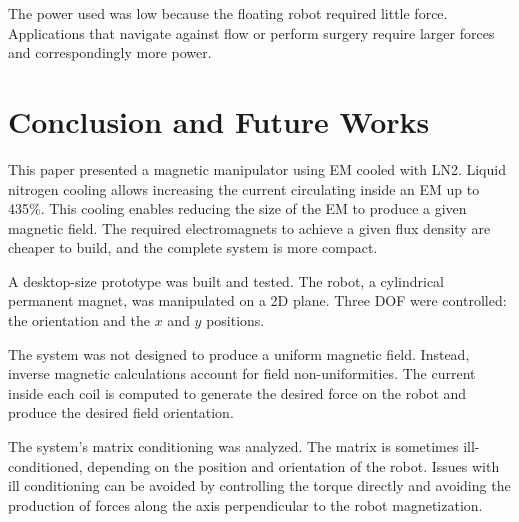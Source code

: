 The power used was low because the floating robot required little force.
Applications that navigate against flow or perform surgery require larger forces and correspondingly more power.


 
% 
\section{Conclusion and Future Works}
This paper presented a magnetic manipulator using EM cooled with LN2. 
Liquid nitrogen cooling allows increasing the current circulating inside an EM up to 435\%. 
This cooling enables reducing the size of the EM to produce a given magnetic field. 
The required electromagnets to achieve a given flux density are cheaper to build, and the complete system is more compact. 
\par
%
A desktop-size prototype was built and tested. 
The robot, a cylindrical permanent magnet, was manipulated on a 2D plane. 
Three DOF were controlled: the orientation and the $x$ and $y$ positions.\par
%
The system was not designed to produce a uniform magnetic field. 
Instead, inverse magnetic calculations account for field non-uniformities.
The current inside each coil is computed to generate the desired force on the robot and produce the desired field orientation. 
 \par
The system's matrix conditioning was analyzed. 
 The matrix is sometimes ill-conditioned, depending on the position and orientation of the robot. 
  Issues with ill conditioning can be avoided by controlling the torque directly and avoiding the production of forces along the axis perpendicular to the robot magnetization.
